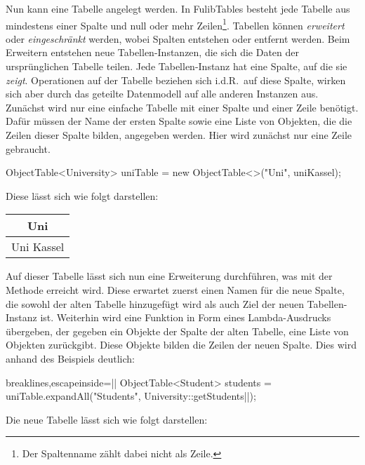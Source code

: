 Nun kann eine Tabelle angelegt werden.
In FulibTables besteht jede Tabelle aus mindestens einer Spalte und null oder mehr Zeilen\footnote{Der Spaltenname zählt dabei nicht als Zeile.}.
Tabellen können \emph{erweitert} oder \emph{eingeschränkt} werden, wobei Spalten entstehen oder entfernt werden.
Beim Erweitern entstehen neue Tabellen-Instanzen,
die sich die Daten der ursprünglichen Tabelle teilen.
Jede Tabellen-Instanz hat eine Spalte, auf die sie \emph{zeigt}.
Operationen auf der Tabelle beziehen sich i.d.R.\ auf diese Spalte,
wirken sich aber durch das geteilte Datenmodell auf alle anderen Instanzen aus.
Zunächst wird nur eine einfache Tabelle mit einer Spalte und einer Zeile benötigt.
Dafür müssen der Name der ersten Spalte sowie eine Liste von Objekten, die die Zeilen dieser Spalte bilden, angegeben werden.
Hier wird zunächst nur eine Zeile gebraucht.

\begin{jcodeblock}
    ObjectTable<University> uniTable = new ObjectTable<>("Uni", uniKassel);
\end{jcodeblock}

Diese lässt sich wie folgt darstellen:

\begin{tabular}{|c|}
    \hline
    \textbf{Uni} \\
    \hline
    Uni Kassel \\
    \hline
\end{tabular}

Auf dieser Tabelle lässt sich nun eine Erweiterung durchführen, was mit der Methode  erreicht wird.
Diese erwartet zuerst einen Namen für die neue Spalte, die sowohl der alten Tabelle hinzugefügt wird als auch Ziel der neuen Tabellen-Instanz ist.
Weiterhin wird eine Funktion in Form eines Lambda-Ausdrucks übergeben,
der gegeben ein Objekte der Spalte der alten Tabelle, eine Liste von Objekten zurückgibt.
Diese Objekte bilden die Zeilen der neuen Spalte.
Dies wird anhand des Beispiels deutlich:

\begin{jcodeblock*}{breaklines,escapeinside=||}
    ObjectTable<Student> students = uniTable.expandAll("Students", University::getStudents|\footnotemark|);
\end{jcodeblock*}

Die neue Tabelle lässt sich wie folgt darstellen:

